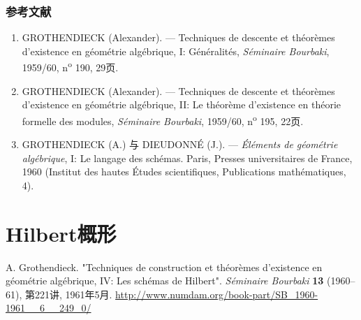 \section*{参考文献}

\begin{enumerate}
\item[{[1]}]\label{fga3.iii-bib-1} GROTHENDIECK (Alexander). --- Techniques de descente et théorèmes d'existence en géométrie algébrique, I: Généralités, \emph{Séminaire Bourbaki}, 1959/60, n\textsuperscript{o} 190, 29页.
\item[{[2]}]\label{fga3.iii-bib-2} GROTHENDIECK (Alexander). --- Techniques de descente et théorèmes d'existence en géométrie algébrique, II: Le théorème d'existence en théorie formelle des modules, \emph{Séminaire Bourbaki}, 1959/60, n\textsuperscript{o} 195, 22页.
\item[{[3]}]\label{fga3.iii-bib-3} GROTHENDIECK (A.) 与 DIEUDONNÉ (J.). --- \emph{Éléments de géométrie algébrique}, I: Le langage des schémas. Paris, Presses universitaires de France, 1960 (Institut des hautes Études scientifiques, Publications mathématiques, 4).

\end{enumerate}


\clearpage
\setcounter{chapter}{-1}
\renewcommand\fgaAnchorPrefix{fga3.iv}

\part{Hilbert概形}\label{fga3.iv}\thispagestyle{fancy}
\begin{original}{}\label{fga3.iv-original-citation}\skipsinglepar
\par{}A. Grothendieck. "Techniques de construction et théorèmes d'existence en géométrie algébrique, IV: Les schémas de Hilbert". \emph{Séminaire Bourbaki} \textbf{13} (1960–61), 第221讲, 1961年5月. \url{http://www.numdam.org/book-part/SB_1960-1961__6__249_0/}
\end{original}
